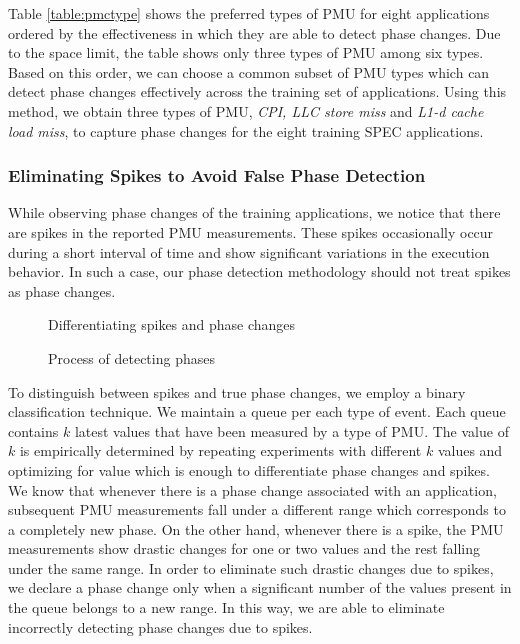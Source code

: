 \documentclass{sig-alternate}
\begin{document}
Table \ref{table:pmctype} shows the preferred types of PMU for eight applications ordered by the effectiveness in which they are able to detect phase changes. Due to the space limit, the table shows only three types of PMU among six types. Based on this order, we can choose a common subset of PMU types which can detect phase changes effectively across the training set of applications. Using this method, we obtain three types of PMU, \textit{CPI, LLC store miss} and \textit{L1-d cache load miss}, to capture phase changes for the eight training SPEC applications.
\subsubsection{Eliminating Spikes to Avoid False Phase Detection}
\label{subsubsec:EliminatingSpikestoAvoidFalsePhaseDetection}

While observing phase changes of the training applications, we notice that there are spikes in the reported PMU measurements. These spikes occasionally occur during a short interval of time and show significant variations in the execution behavior. 
In such a case, our phase detection methodology should not treat spikes as phase changes.
\begin{figure}
\centering
\begin{minipage}[t]{1\columnwidth}
\centering
{}
\caption{Differentiating spikes and phase changes\vspace{-0.3in}}
\label{fig:noise_elimination}
\end{minipage}
\end{figure}
\begin{figure*}
\centering
\begin{minipage}[t]{2\columnwidth}
\centering
{}
\caption{Process of detecting phases}
\label{fig:detect_phases}
\end{minipage}
\end{figure*}

To distinguish between spikes and true phase changes, we employ a binary classification technique. We maintain a queue per each type of event. Each queue contains $k$ latest values that have been measured by a type of PMU. The value of $k$ is empirically determined by repeating experiments with different $k$ values and optimizing for value which is enough to differentiate phase changes and spikes. We know that whenever there is a phase change associated with an application, subsequent PMU measurements fall under a different range which corresponds to a completely new phase. On the other hand, whenever there is a spike, the PMU measurements show drastic changes for one or two values and the rest falling under the same range. In order to eliminate such drastic changes due to spikes, we declare a phase change only when a significant number of the values present in the queue belongs to a new range. In this way, we are able to eliminate incorrectly detecting phase changes due to spikes.
\end{document}
